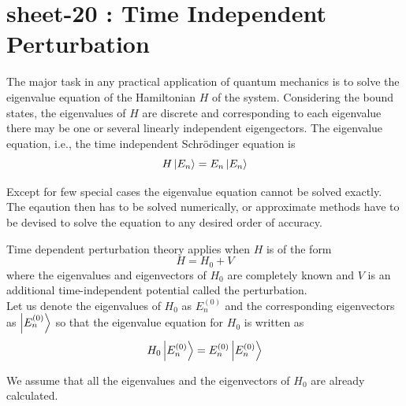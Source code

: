 %
%
%

\chapter{sheet-20 : Time Independent Perturbation}

The major task in any practical application of quantum mechanics is to solve the eigenvalue equation of the Hamiltonian $H$ of the system. Considering the bound states, the eigenvalues of $H$ are discrete and corresponding to each eigenvalue there may be one or several linearly independent eigengectors. The eigenvalue equation, i.e., the time independent Schr\"{o}dinger equation is 
\begin{equation}
	H \ket{E_n} = E_n \ket{E_n}
	\label{chapter20.eqn1-intro}
\end{equation}

Except for few special cases the eigenvalue equation cannot be solved exactly. The eqaution then has to be solved numerically, or approximate methods have to be devised to solve the equation to any desired order of accuracy.

Time dependent perturbation theory applies when $H$ is of the form
\begin{equation}
	H = H_0 + V
	\label{chapter20.eqn2-intro}
\end{equation}
where the eigenvalues and eigenvectors of $H_0$ are completely known and $V$ is an additional time-independent potential called the perturbation.\\


Let us denote the eigenvalues of $H_0$ as $E_n^{(0)}$ and the corresponding eigenvectors as $\ket{E_n^{(0)}}$  so that the eigenvalue equation for $H_0$ is written as
\begin{equation}
	H_0 \ket{E_n^{(0)}} = E_n^{(0)} \ket{E_n^{(0)}}
	\label{chapter20.eqn3-intro}
\end{equation}

We assume that all the eigenvalues and the eigenvectors of $H_0$ are already calculated.

